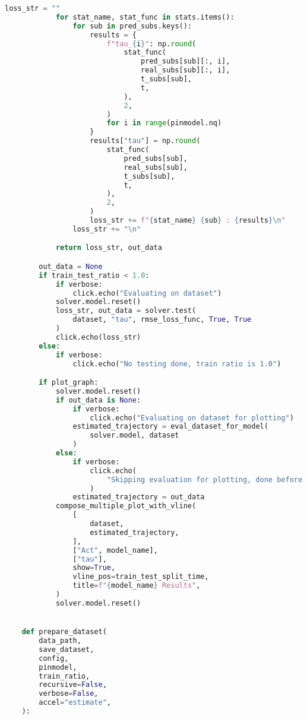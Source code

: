 \begin{lstlisting}[language=python, caption=\raggedright{identification/full.py}, frame=single]
            loss_str = ""
            for stat_name, stat_func in stats.items():
                for sub in pred_subs.keys():
                    results = {
                        f"tau_{i}": np.round(
                            stat_func(
                                pred_subs[sub][:, i],
                                real_subs[sub][:, i],
                                t_subs[sub],
                                t,
                            ),
                            2,
                        )
                        for i in range(pinmodel.nq)
                    }
                    results["tau"] = np.round(
                        stat_func(
                            pred_subs[sub],
                            real_subs[sub],
                            t_subs[sub],
                            t,
                        ),
                        2,
                    )
                    loss_str += f"{stat_name} {sub} : {results}\n"
                loss_str += "\n"

            return loss_str, out_data

        out_data = None
        if train_test_ratio < 1.0:
            if verbose:
                click.echo("Evaluating on dataset")
            solver.model.reset()
            loss_str, out_data = solver.test(
                dataset, "tau", rmse_loss_func, True, True
            )
            click.echo(loss_str)
        else:
            if verbose:
                click.echo("No testing done, train ratio is 1.0")

        if plot_graph:
            solver.model.reset()
            if out_data is None:
                if verbose:
                    click.echo("Evaluating on dataset for plotting")
                estimated_trajectory = eval_dataset_for_model(
                    solver.model, dataset
                )
            else:
                if verbose:
                    click.echo(
                        "Skipping evaluation for plotting, done before for testing"
                    )
                estimated_trajectory = out_data
            compose_multiple_plot_with_vline(
                [
                    dataset,
                    estimated_trajectory,
                ],
                ["Act", model_name],
                ["tau"],
                show=True,
                vline_pos=train_test_split_time,
                title=f"{model_name} Results",
            )
            solver.model.reset()


    def prepare_dataset(
        data_path,
        save_dataset,
        config,
        pinmodel,
        train_ratio,
        recursive=False,
        verbose=False,
        accel="estimate",
    ):


\end{lstlisting}
